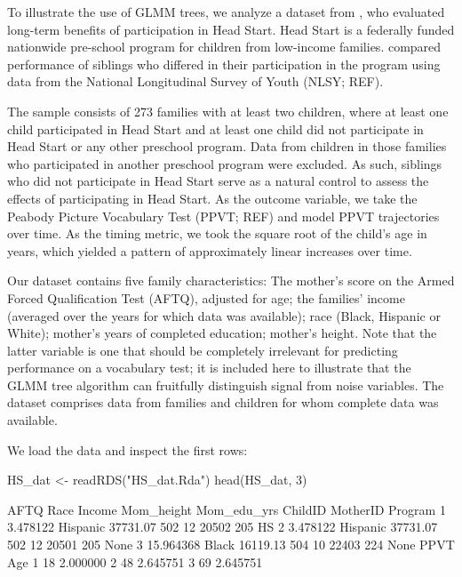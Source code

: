 \documentclass[doc,floatsintext,natbib]{apa7}
\begin{document}
To illustrate the use of GLMM trees, we analyze a dataset from \cite{Demi09}, who evaluated long-term benefits of participation in Head Start. Head Start is a federally funded nationwide  pre-school program for children from low-income families. \cite{Demi09} compared performance of siblings who differed in their participation in the program using data from the National Longitudinal Survey of Youth (NLSY; REF). 

The sample consists of 273 families with at least two children, where at least one child participated in Head Start and at least one child did not participate in Head Start or any other preschool program. Data from children in those families who participated in another preschool program were excluded. As such, siblings who did not participate in Head Start serve as a natural control to assess the effects of participating in Head Start. As the outcome variable, we take the Peabody Picture Vocabulary Test (PPVT; REF) and model PPVT trajectories over time. As the timing metric, we took the square root of the child's age in years, which yielded a pattern of approximately linear increases over time.

Our dataset contains five family characteristics: The mother's score on the Armed Forced Qualification Test (AFTQ), adjusted for age; the families' income (averaged over the years for which data was available); race (Black, Hispanic or White); mother's years of completed education; mother's height. Note that the latter variable is one that should be completely irrelevant for predicting performance on a vocabulary test; it is included here to illustrate that the GLMM tree algorithm can fruitfully distinguish signal from noise variables. The dataset comprises data from families and children for whom complete data was available. 

We load the data and inspect the first rows:

\begin{Schunk}
\begin{Sinput}
 HS_dat <- readRDS("HS_dat.Rda")
 head(HS_dat, 3)
\end{Sinput}
\begin{Soutput}
       AFTQ     Race   Income Mom_height Mom_edu_yrs ChildID MotherID Program
1  3.478122 Hispanic 37731.07        502          12   20502      205      HS
2  3.478122 Hispanic 37731.07        502          12   20501      205    None
3 15.964368    Black 16119.13        504          10   22403      224    None
  PPVT      Age
1   18 2.000000
2   48 2.645751
3   69 2.645751
\end{Soutput}
\end{Schunk}
\end{document}
